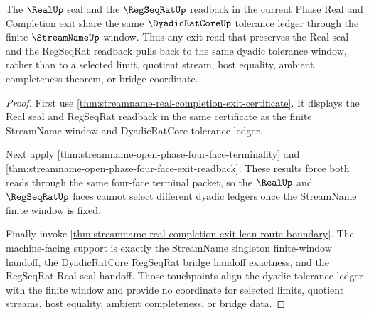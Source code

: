 \begin{theorem}
\label{thm:streamname-real-regseqrat-dyadic-window-pullback}
The $\RealUp$ seal and the $\RegSeqRatUp$ readback in the current Phase Real and Completion exit share the same $\DyadicRatCoreUp$ tolerance ledger through the finite $\StreamNameUp$ window. Thus any exit read that preserves the Real seal and the RegSeqRat readback pulls back to the same dyadic tolerance window, rather than to a selected limit, quotient stream, host equality, ambient completeness theorem, or bridge coordinate.
\end{theorem}
\begin{proof}
First use \autoref{thm:streamname-real-completion-exit-certificate}. It displays the Real seal and RegSeqRat readback in the same certificate as the finite StreamName window and DyadicRatCore tolerance ledger.

Next apply \autoref{thm:streamname-open-phase-four-face-terminality} and \autoref{thm:streamname-open-phase-four-face-exit-readback}. These results force both reads through the same four-face terminal packet, so the $\RealUp$ and $\RegSeqRatUp$ faces cannot select different dyadic ledgers once the StreamName finite window is fixed.

Finally invoke \autoref{thm:streamname-real-completion-exit-lean-route-boundary}. The machine-facing support is exactly the StreamName singleton finite-window handoff, the DyadicRatCore RegSeqRat bridge handoff exactness, and the RegSeqRat Real seal handoff. Those touchpoints align the dyadic tolerance ledger with the finite window and provide no coordinate for selected limits, quotient streams, host equality, ambient completeness, or bridge data.
\end{proof}

